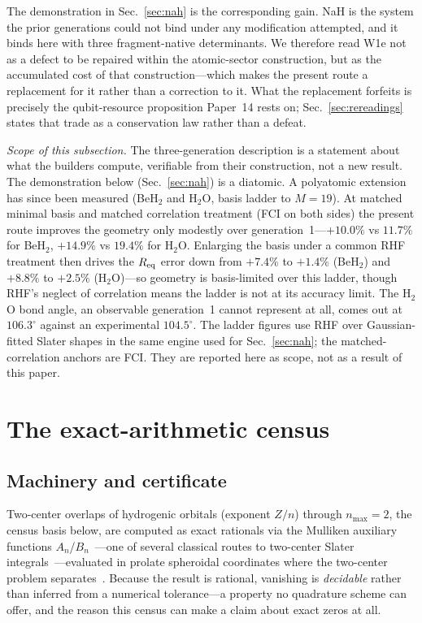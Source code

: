 \documentclass[aps,pra,twocolumn,superscriptaddress,longbibliography]{revtex4-2}
\begin{document}
The demonstration in Sec.~\ref{sec:nah} is the corresponding gain.  NaH is
the system the prior generations could not bind under any modification
attempted, and it binds here with three fragment-native determinants.  We
therefore read W1e not as a defect to be repaired within the atomic-sector
construction, but as the accumulated cost of that construction---which
makes the present route a replacement for it rather than a correction to
it.  What the replacement forfeits is precisely the qubit-resource
proposition Paper~14 rests on; Sec.~\ref{sec:rereadings} states that
trade as a conservation law rather than a defeat.

\emph{Scope of this subsection.}  The three-generation description is a
statement about what the builders compute, verifiable from their
construction, not a new result.  The demonstration below (Sec.~\ref{sec:nah})
is a diatomic.  A polyatomic extension has since been measured
(BeH$_2$ and H$_2$O, basis ladder to $M = 19$).  At matched minimal basis and
matched correlation treatment (FCI on both sides) the present route improves
the geometry only modestly over generation~1---$+10.0\%$ vs $11.7\%$ for
BeH$_2$, $+14.9\%$ vs $19.4\%$ for H$_2$O.  Enlarging the basis under a common
RHF treatment then drives the $R_{\rm eq}$ error down from $+7.4\%$ to $+1.4\%$
(BeH$_2$) and $+8.8\%$ to $+2.5\%$ (H$_2$O)---so geometry is basis-limited over
this ladder, though RHF's neglect of correlation means the ladder is not at its
accuracy limit.  The H$_2$O bond angle, an observable generation~1 cannot
represent at all, comes out at $106.3^\circ$ against an experimental
$104.5^\circ$.  The ladder figures use RHF over Gaussian-fitted Slater shapes
in the same engine used for Sec.~\ref{sec:nah}; the matched-correlation anchors
are FCI.  They are reported here as scope, not as a result of this paper.

\section{The exact-arithmetic census}
\label{sec:census}

\subsection{Machinery and certificate}

Two-center overlaps of hydrogenic orbitals (exponent $Z/n$) through
$n_{\max}=2$, the census basis below, are computed as exact
rationals via the Mulliken auxiliary functions
$A_n$/$B_n$~\cite{mulliken1949,roothaan1951}---one of several classical
routes to two-center Slater integrals~\cite{barnett_coulson1951,
filter_steinborn1978}---evaluated in prolate spheroidal coordinates
where the two-center problem
separates~\cite{loutey_paper11}.  Because the result is rational,
vanishing is \emph{decidable} rather than inferred from a numerical
tolerance---a property no quadrature scheme can offer, and the reason
this census can make a claim about exact zeros at all.
\end{document}
